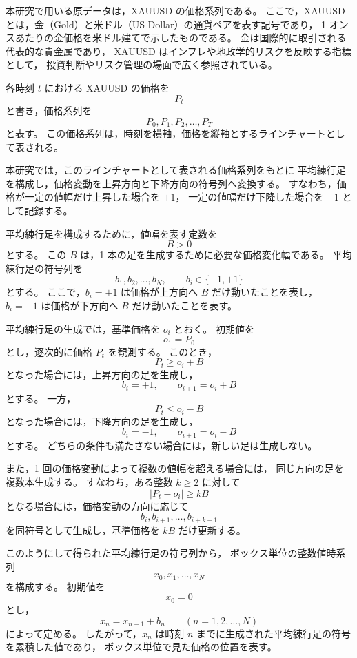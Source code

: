 \documentclass[a4j,dvipdfmx]{jsarticle}
\theoremstyle{plainnote}
\begin{document}
本研究で用いる原データは，XAUUSD の価格系列である。
ここで，XAUUSD とは，金（Gold）と米ドル（US Dollar）の通貨ペアを表す記号であり，
1 オンスあたりの金価格を米ドル建てで示したものである。
金は国際的に取引される代表的な貴金属であり，
XAUUSD はインフレや地政学的リスクを反映する指標として，
投資判断やリスク管理の場面で広く参照されている。

各時刻 $t$ における XAUUSD の価格を
\[
  P_t
\]
と書き，価格系列を
\[
  P_0,P_1,P_2,\ldots,P_T
\]
と表す。
この価格系列は，時刻を横軸，価格を縦軸とするラインチャートとして表される。

本研究では，このラインチャートとして表される価格系列をもとに
平均練行足を構成し，価格変動を上昇方向と下降方向の符号列へ変換する。
すなわち，価格が一定の値幅だけ上昇した場合を $+1$，
一定の値幅だけ下降した場合を $-1$ として記録する。

平均練行足を構成するために，値幅を表す定数を
\[
  B>0
\]
とする。
この $B$ は，1 本の足を生成するために必要な価格変化幅である。
平均練行足の符号列を
\[
  b_1,b_2,\ldots,b_N,
  \qquad b_i\in\{-1,+1\}
\]
とする。
ここで，$b_i=+1$ は価格が上方向へ $B$ だけ動いたことを表し，
$b_i=-1$ は価格が下方向へ $B$ だけ動いたことを表す。

平均練行足の生成では，基準価格を $o_i$ とおく。
初期値を
\[
  o_1=P_0
\]
とし，逐次的に価格 $P_t$ を観測する。
このとき，
\[
  P_t \geq o_i+B
\]
となった場合には，上昇方向の足を生成し，
\[
  b_i=+1,\qquad o_{i+1}=o_i+B
\]
とする。
一方，
\[
  P_t \leq o_i-B
\]
となった場合には，下降方向の足を生成し，
\[
  b_i=-1,\qquad o_{i+1}=o_i-B
\]
とする。
どちらの条件も満たさない場合には，新しい足は生成しない。

また，1 回の価格変動によって複数の値幅を超える場合には，
同じ方向の足を複数本生成する。
すなわち，ある整数 $k\geq2$ に対して
\[
  |P_t-o_i|\geq kB
\]
となる場合には，価格変動の方向に応じて
\[
  b_i,b_{i+1},\ldots,b_{i+k-1}
\]
を同符号として生成し，基準価格を $kB$ だけ更新する。

このようにして得られた平均練行足の符号列から，
ボックス単位の整数値時系列
\[
  x_0,x_1,\ldots,x_N
\]
を構成する。
初期値を
\begin{equation}
  x_0=0
  \label{eq:analysis_x0}
\end{equation}
とし，
\begin{equation}
  x_n=x_{n-1}+b_n
  \qquad (n=1,2,\ldots,N)
  \label{eq:analysis_xn}
\end{equation}
によって定める。
したがって，$x_n$ は時刻 $n$ までに生成された平均練行足の符号を累積した値であり，
ボックス単位で見た価格の位置を表す。
\end{document}
